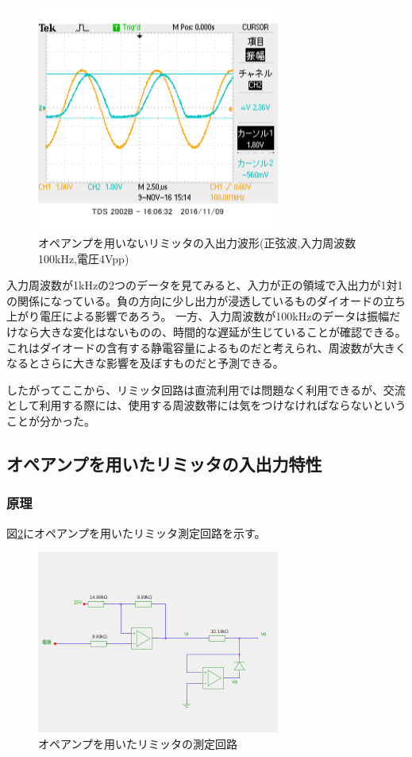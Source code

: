 \documentclass[11pt,a4j]{jsarticle}
\begin{document}
 \begin{figure}[htbp]
  \centering
  \includegraphics[width=8cm,clip]{1_1_noampFG_f100V4_ViVo.png}
  \caption{オペアンプを用いないリミッタの入出力波形(正弦波,入力周波数100kHz,電圧4Vpp)}
  \label{fig:noamp_f100V4}
 \end{figure}%
    
    入力周波数が1kHzの2つのデータを見てみると、入力が正の領域で入出力が1対1の関係になっている。負の方向に少し出力が浸透しているものダイオードの立ち上がり電圧による影響であろう。
    一方、入力周波数が100kHzのデータは振幅だけなら大きな変化はないものの、時間的な遅延が生じていることが確認できる。これはダイオードの含有する静電容量によるものだと考えられ、周波数が大きくなるとさらに大きな影響を及ぼすものだと予測できる。
    
    したがってここから、リミッタ回路は直流利用では問題なく利用できるが、交流として利用する際には、使用する周波数帯には気をつけなければならないということが分かった。
    
    
  \subsection{オペアンプを用いたリミッタの入出力特性}
   \subsubsection{原理}
    
    図\ref{fig:amp_tokusei}にオペアンプを用いたリミッタ測定回路を示す。
    
    \begin{figure}[htbp]
  \centering
  \includegraphics[width=8cm,clip]{amp_tokusei.png}
  \caption{オペアンプを用いたリミッタの測定回路}
  \label{fig:amp_tokusei}
 \end{figure}%
    
\end{document}
